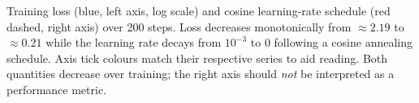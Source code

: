 \caption{Training loss (blue, left axis, log scale) and cosine learning-rate schedule (red dashed, right axis) over 200 steps. Loss decreases monotonically from ${\approx}2.19$ to ${\approx}0.21$ while the learning rate decays from $10^{-3}$ to $0$ following a cosine annealing schedule. Axis tick colours match their respective series to aid reading. Both quantities decrease over training; the right axis should \emph{not} be interpreted as a performance metric.}
